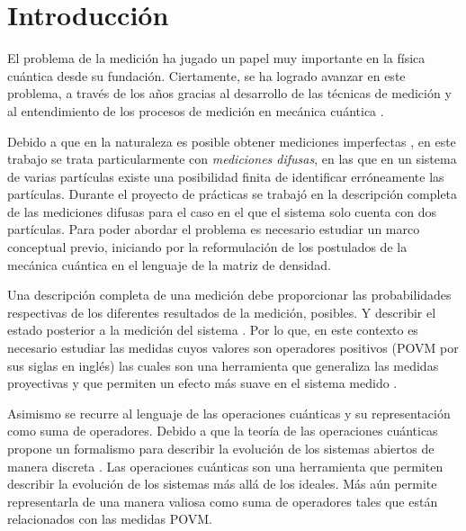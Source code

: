\chapter*{Introducción}

El problema de la medición ha jugado un papel muy importante en la física
cuántica desde su fundación. Ciertamente, se ha logrado avanzar en este
problema, a través de los años gracias al desarrollo de las técnicas de
medición y al entendimiento de los procesos de medición en mecánica cuántica
{\cite{Pineda_2021}}. 

Debido a que en la naturaleza es posible obtener mediciones imperfectas , en
este trabajo se trata particularmente con \textit{mediciones difusas}, en las
que en un sistema de varias partículas existe una posibilidad finita de
identificar erróneamente las partículas. Durante el proyecto de prácticas se
trabajó en la descripción completa de las mediciones difusas para el caso en el
que el sistema solo cuenta con dos partículas. Para poder abordar el problema
es necesario estudiar un marco conceptual previo, iniciando por la
reformulación de los postulados de la mecánica cuántica en el lenguaje de la
matriz de densidad.

Una descripción completa de una medición debe proporcionar las probabilidades
respectivas de los diferentes resultados de la medición, posibles. Y describir
el estado posterior a la medición del sistema . Por lo que, en este contexto es
necesario estudiar las medidas cuyos valores son operadores positivos (POVM por
sus siglas en inglés) las cuales son una herramienta que generaliza las medidas
proyectivas y que permiten un efecto más suave en el sistema medido .

Asimismo se recurre al lenguaje de las operaciones cuánticas y su
representación como  suma de operadores. Debido a que la teoría de las
operaciones cuánticas propone un formalismo para describir la evolución de los
sistemas abiertos de manera discreta {\cite{nielsen_chuang_2010}}. Las
operaciones cuánticas son una herramienta que permiten describir la evolución
de los sistemas más allá de los ideales. Más aún permite representarla de una
manera valiosa como suma de operadores tales que están relacionados con las
medidas POVM\@. 

